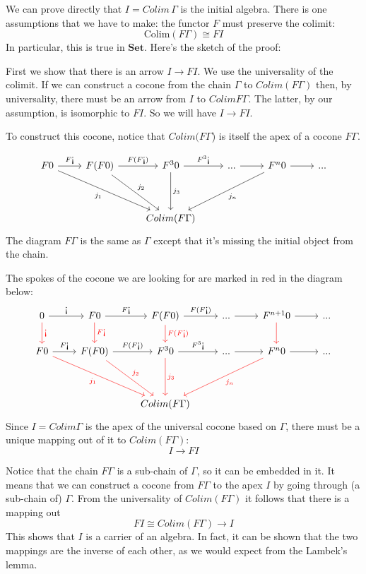 \documentclass[DaoFP]{subfiles}
\begin{document}
We can  prove directly that $I = Colim\, \Gamma$ is the initial algebra. There is one assumptions that we have to make: the functor $F$ must preserve the colimit: 
\[ \text{Colim} (F \Gamma) \cong F I \]
In particular, this is true in $\mathbf{Set}$. Here's the sketch of the proof: 

First we show that there is an arrow $I \to F I$. We use the universality of the colimit. If we can construct a cocone from the chain $\Gamma$ to $Colim (F \Gamma)$ then, by universality, there must be an arrow from $I$ to $Colim F \Gamma$. The latter, by our assumption, is isomorphic to $F I$. So we will have $I \to F I$.

To construct this cocone, notice that $Colim (F \Gamma$) is itself the apex of a cocone $F \Gamma$. 

\[
 \begin{tikzcd}
 F 0
 \arrow[r, "F \mbox{!`}"]
 \arrow[ddrr, "j_1"']
 &  F (F 0)
  \arrow[r, "F(F  \mbox{!`})"]
 \arrow[ddr, "j_2"]
& F^3 0
  \arrow[r, "F^3\mbox{!`}"]
  \arrow[dd, "j_3"]
 & ...
 \arrow[r]
 & F^n 0
  \arrow[r]
 \arrow[ddll, "j_n"]
 & ...
 \\
 \\
 &&Colim (F \Gamma)
  \end{tikzcd}
\]
The diagram $F \Gamma$ is the same as $\Gamma$ except that it's missing the initial object from the chain.

The spokes of the cocone we are looking for are marked in red in the diagram below:
\[
 \begin{tikzcd}
 0
 \arrow[r, "\mbox{!`}"]
 \arrow[d, red, "\mbox{!`}"]
 & F 0
  \arrow[r, "F\mbox{!`}"]
  \arrow[d, red, "F\mbox{!`}"]
& F (F 0)
  \arrow[r, "F(F\mbox{!`})"]
  \arrow[d, red, "F(F\mbox{!`})"]
 & ...
 \arrow[r]
 & F^{n+1} 0
  \arrow[r]
  \arrow[d, red]
 & ...
 \\
 F 0
 \arrow[r, "F \mbox{!`}"]
 \arrow[ddrr, red, "j_1"']
 &  F (F 0)
  \arrow[r, "F(F  \mbox{!`})"]
 \arrow[ddr, red, "j_2"]
& F^3 0
  \arrow[r, "F^3\mbox{!`}"]
  \arrow[dd, red, "j_3"]
 & ...
 \arrow[r]
 & F^n 0
  \arrow[r]
 \arrow[ddll, red, "j_n"]
 & ...
 \\
 \\
 &&Colim (F \Gamma)
  \end{tikzcd}
\]
Since $I = Colim \Gamma$ is the apex of the universal cocone based on $\Gamma$, there must be a unique mapping out of it to $Colim (F \Gamma)$:
\[ I \to F I \]

Notice that the chain $F \Gamma$ is a sub-chain of $\Gamma$, so it can be embedded in it. It means that we can construct a cocone from $F \Gamma$ to the apex $I$ by going through (a sub-chain of) $\Gamma$. From the universality of $Colim (F \Gamma)$ it follows that there is a mapping out 
\[ F I \cong Colim (F \Gamma) \to I \]
This shows that $I$ is a carrier of an algebra. In fact, it can be shown that the two mappings are the inverse of each other, as we would expect from the Lambek's lemma.
\end{document}
